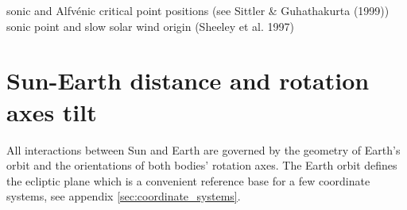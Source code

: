sonic and Alfvénic critical point positions (see Sittler \& Guhathakurta (1999))\\
sonic point and slow solar wind origin (Sheeley et al. 1997)\\







\section{Sun-Earth distance and rotation axes tilt}
\label{sec:sun_earth_orbit_geometry}
All interactions between Sun and Earth are governed by the geometry of Earth's orbit and the orientations of both bodies' rotation axes. The Earth orbit defines the ecliptic plane which is a convenient reference base for a few coordinate systems, see appendix \autoref{sec:coordinate_systems}.

